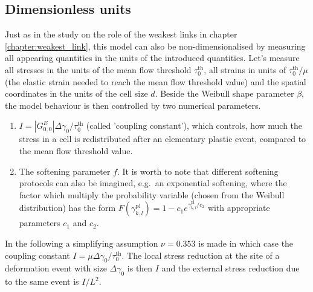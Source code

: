 \subsection{Dimensionless units}
Just as in the study on the role of the weakest links in chapter \ref{chapter:weakest_link}, this model can also be non-dimensionalised by measuring all appearing quantities in the units of the introduced quantities. Let's measure all stresses in the units of the mean flow threshold $\tau _0^{{\text{th}}}$, all strains in units of $\tau _0^{{\text{th}}}/\mu $ (the elastic strain needed to reach the mean flow threshold value) and the spatial coordinates in the units of the cell size $d$. Beside the Weibull shape parameter $\beta$, the model behaviour is then controlled by two numerical parameters. \begin{enumerate}
\item $I = \left| {G_{0,0}^E} \right|\Delta {\gamma _0}/\tau _0^{{\text{th}}}$ (called 'coupling constant'), which controls, how much the stress in a cell is redistributed after an elementary plastic event, compared to the mean flow threshold value.
\item The softening parameter $f$. It is worth to note that different softening protocols can also be imagined, e.g.\ an exponential softening, where the factor which multiply the probability variable (chosen from the Weibull distribution) has the form $F\left( {\gamma _{k,l}^{{\text{pl}}}} \right) = 1 - {c_1}{e^{\gamma _{k,l}^{{\text{pl}}}/{c_2}}}$ with appropriate parameters $c_1$ and $c_2$.
\end{enumerate}

In the following a simplifying assumption $\nu  = 0.353$ is made in which case the coupling constant $I = \mu \Delta {\gamma _0}/\tau _0^{{\text{th}}}$. The local stress reduction at the site of a deformation event with size $\Delta {\gamma _0}$ is then $I$ and the external stress reduction due to the same event is $I/L^2$.


